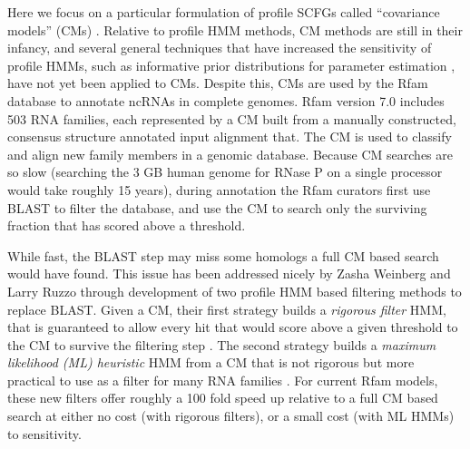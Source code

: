 \documentclass[11pt]{article}
\begin{document}
Here we focus on a particular formulation of profile SCFGs called
``covariance models'' (CMs) \cite{Eddy94, Durbin98, Eddy02b}. 
Relative to profile HMM methods, CM methods are still in their
infancy, and several general techniques that have increased the
sensitivity of profile HMMs, such as informative prior distributions
for parameter estimation \cite{Sjolander96}, have not yet been applied
to CMs. Despite this, CMs are used by the Rfam database
\cite{Griffiths-Jones05} to annotate ncRNAs in complete
genomes. Rfam version 7.0 includes 503 RNA families, each represented
by a CM built from a manually constructed, consensus
structure annotated input alignment that.  The CM is used to
classify and align new family members in a genomic database. Because
CM searches are so slow (searching the 3 GB
human genome for RNase P on a single processor would take roughly 15
years), during annotation the Rfam curators first use \textsc{BLAST}
to filter the database, and use the CM to search only the surviving
fraction that has scored above a threshold. 

While fast, the \textsc{BLAST} step may miss some homologs a full CM
based search would have found. This issue has been addressed nicely
by Zasha Weinberg and Larry Ruzzo through development of two profile HMM
based filtering methods to replace \textsc{BLAST}. Given a CM, their
first strategy builds a \emph{rigorous filter} HMM, that is guaranteed
to allow every hit that would score above a given threshold to the CM
to survive the filtering step \cite{Weinberg04, Weinberg04b}. The second
strategy builds a \emph{maximum likelihood (ML) heuristic} HMM from a
CM that is not rigorous but more practical to use as a filter for many
RNA families \cite{Weinberg05}. For current Rfam models, these new
filters offer roughly a 100 fold speed up relative to a full CM based search 
at either no cost (with rigorous filters), or a small cost (with ML HMMs) to
sensitivity.
\end{document}

